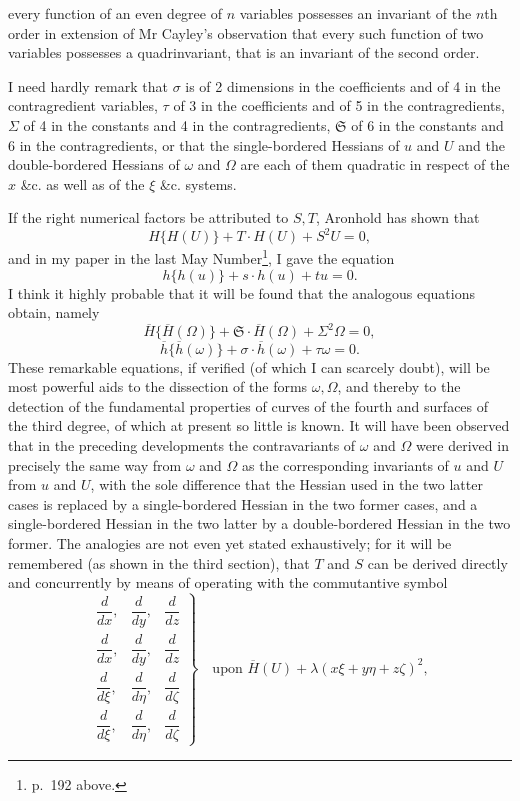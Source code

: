 \documentclass[11pt]{article}
\newcommand{\sourcepage}[1]{\marginpar{\scriptsize p.~#1}}
\begin{document}
\sourcepage{331}
every function of an even degree of $n$ variables possesses an invariant of the $n$th order in extension of Mr Cayley's observation that every such function of two variables possesses a quadrinvariant, that is an invariant of the second order.

I need hardly remark that $\sigma$ is of 2 dimensions in the coefficients and of 4 in the contragredient variables, $\tau$ of 3 in the coefficients and of 5 in the contragredients, $\Sigma$ of 4 in the constants and 4 in the contragredients, $\mathfrak{S}$ of 6 in the constants and 6 in the contragredients, or that the single-bordered Hessians of $u$ and $U$ and the double-bordered Hessians of $\omega$ and $\Omega$ are each of them quadratic in respect of the $x$ \&c. as well as of the $\xi$ \&c. systems.

If the right numerical factors be attributed to $S,T$, Aronhold has shown that
\[
H\{H(U)\}+T\cdot H(U)+S^2U=0,
\]
and in my paper in the last May Number\footnote{p.~192 above.}, I gave the equation
\[
h\{h(u)\}+s\cdot h(u)+tu=0.
\]
I think it highly probable that it will be found that the analogous equations obtain, namely
\[
\overline H\{\overline H(\Omega)\}
+\mathfrak{S}\cdot\overline H(\Omega)+\Sigma^2\Omega=0,
\]
\[
\overline h\{\overline h(\omega)\}+\sigma\cdot\overline h(\omega)+\tau\omega=0.
\]
These remarkable equations, if verified (of which I can scarcely doubt), will be most powerful aids to the dissection of the forms $\omega,\Omega$, and thereby to the detection of the fundamental properties of curves of the fourth and surfaces of the third degree, of which at present so little is known. It will have been observed that in the preceding developments the contravariants of $\omega$ and $\Omega$ were derived in precisely the same way from $\omega$ and $\Omega$ as the corresponding invariants of $u$ and $U$ from $u$ and $U$, with the sole difference that the Hessian used in the two latter cases is replaced by a single-bordered Hessian in the two former cases, and a single-bordered Hessian in the two latter by a double-bordered Hessian in the two former. The analogies are not even yet stated exhaustively; for it will be remembered (as shown in the third section), that $T$ and $S$ can be derived directly and concurrently by means of operating with the commutantive symbol
\[
\left.
\begin{matrix}
\dfrac{d}{dx},&\dfrac{d}{dy},&\dfrac{d}{dz}\\
\dfrac{d}{dx},&\dfrac{d}{dy},&\dfrac{d}{dz}\\
\dfrac{d}{d\xi},&\dfrac{d}{d\eta},&\dfrac{d}{d\zeta}\\
\dfrac{d}{d\xi},&\dfrac{d}{d\eta},&\dfrac{d}{d\zeta}
\end{matrix}
\right\}
\quad\text{upon }\overline H(U)+\lambda(x\xi+y\eta+z\zeta)^2,
\]
\end{document}
